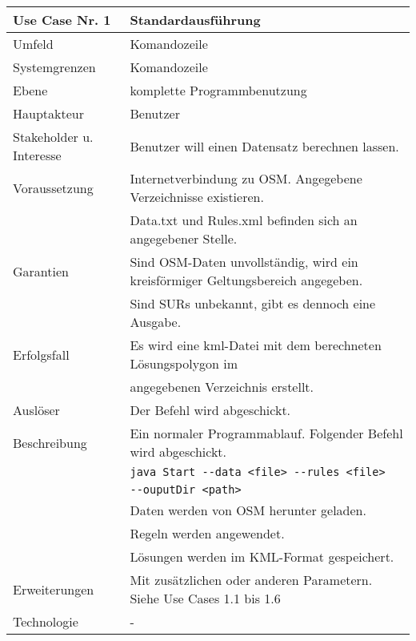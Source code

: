 \begin{tabular}{| l | l |}
 \hline
 \textbf{Use Case Nr. 1} & Standardausführung\\
 \hline
 Umfeld & Komandozeile\\
 \hline
 Systemgrenzen & Komandozeile\\
 \hline
 Ebene & komplette Programmbenutzung\\
 \hline
 Hauptakteur & Benutzer\\
 \hline
 Stakeholder u. Interesse & Benutzer will einen Datensatz berechnen lassen.\\
 \hline
 Voraussetzung & Internetverbindung zu OSM. Angegebene Verzeichnisse existieren.\\
	      & Data.txt und Rules.xml befinden sich an angegebener Stelle. \\
 \hline
 Garantien & Sind OSM-Daten unvollständig, wird ein kreisförmiger Geltungsbereich angegeben.\\
	  & Sind SURs unbekannt, gibt es dennoch eine Ausgabe.\\
 \hline
 Erfolgsfall & Es wird eine kml-Datei mit dem berechneten Lösungspolygon im\\
	    & angegebenen Verzeichnis erstellt.\\
 \hline
 Auslöser & Der Befehl wird abgeschickt.\\
 \hline
 Beschreibung & Ein normaler Programmablauf. Folgender Befehl wird abgeschickt.\\
	    & \verb|java Start --data <file> --rules <file>|\\
	    & \hspace{24pt} \verb|--ouputDir <path>|\\
	    & Daten werden von OSM herunter geladen.\\
	    & Regeln werden angewendet.\\
	    & Lösungen werden im KML-Format gespeichert.\\
 \hline
 Erweiterungen & Mit zusätzlichen oder anderen Parametern. Siehe Use Cases 1.1 bis 1.6\\
 \hline
 Technologie & -\\
 \hline
\end{tabular}



